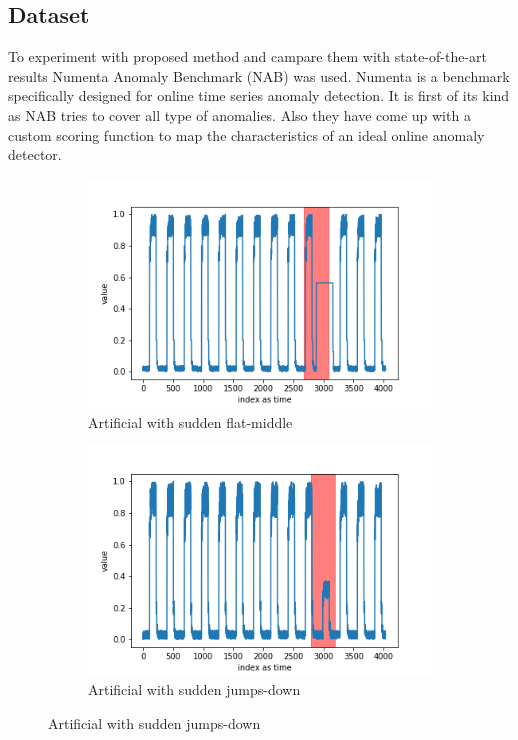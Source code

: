 \documentclass[12pt]{article}
\begin{document}
\subsection{Dataset}
To experiment with proposed method and campare them with state-of-the-art results Numenta Anomaly Benchmark (NAB) was used. Numenta is a benchmark specifically designed for online time series anomaly detection. It is first of its kind as NAB tries to cover all type of anomalies. Also they have come up with a custom scoring function to map the characteristics of an ideal online anomaly detector.\\
\begin{figure}[H]
  \begin{subfigure}[t]{0.5\textwidth}
    \centering
    \includegraphics[width=\linewidth]{images/dataAnomalies/artificial/art_daily_flatmiddle.png}
    \caption{Artificial with sudden flat-middle}
  \end{subfigure}
  \hfill
  \begin{subfigure}[t]{0.5\textwidth}
    \centering
    \includegraphics[width=\linewidth]{images/dataAnomalies/artificial/art_daily_jumpsdown.png}
    \caption{Artificial with sudden jumps-down}
  \end{subfigure}


\end{figure}
\end{document}
